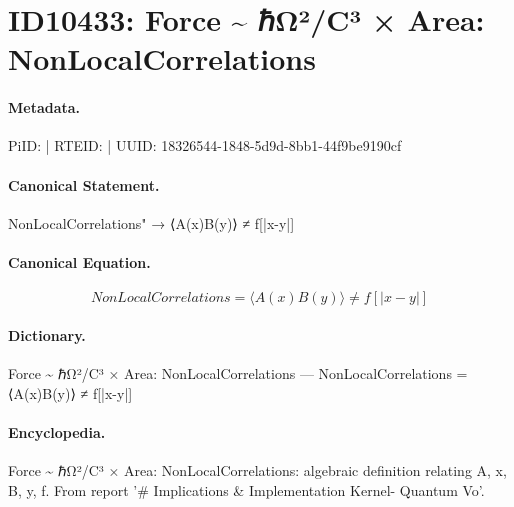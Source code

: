 \section*{ID10433: Force \textasciitilde{} ℏΩ²/C³ × Area: NonLocalCorrelations}
\paragraph{Metadata.}
PiID:  | RTEID:  | UUID: 18326544-1848-5d9d-8bb1-44f9be9190cf

\paragraph{Canonical Statement.}
NonLocalCorrelations" → ⟨A(x)B(y)⟩ ≠ f[|x-y|]

\paragraph{Canonical Equation.}
\[
NonLocalCorrelations = ⟨A(x)B(y)⟩ ≠ f[|x-y|]
\]

\paragraph{Dictionary.}
Force \textasciitilde{} ℏΩ²/C³ × Area: NonLocalCorrelations — NonLocalCorrelations = ⟨A(x)B(y)⟩ ≠ f[|x-y|]

\paragraph{Encyclopedia.}
Force \textasciitilde{} ℏΩ²/C³ × Area: NonLocalCorrelations: algebraic definition relating A, x, B, y, f. From report '\# Implications \& Implementation Kernel- Quantum Vo'.
